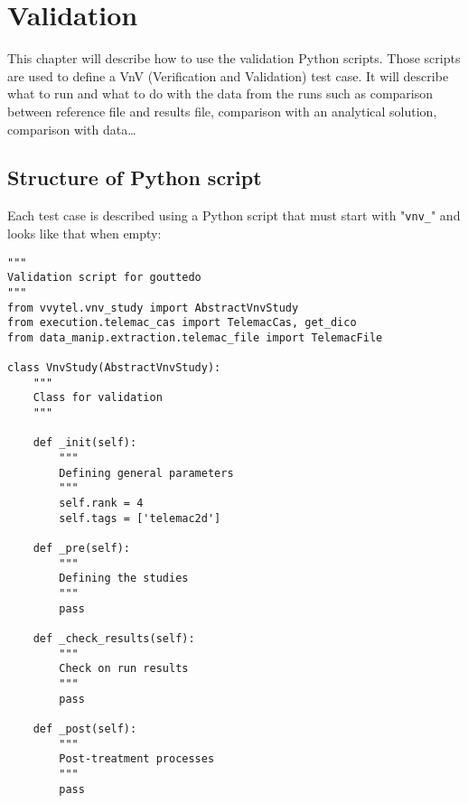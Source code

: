 \chapter{Validation}

This chapter will describe how to use the validation Python scripts.
Those scripts are used to define a VnV (Verification and Validation) test case.
It will describe what to run and what to do with the data from the runs such as
comparison between reference file and results file, comparison with an
analytical solution, comparison with data\ldots

\section{Structure of Python script}
\label{ref:descVnvStudy}

Each test case is described using a Python script that must start with
"\verb!vnv_!" and looks like that when empty:


\begin{lstlisting}
"""
Validation script for gouttedo
"""
from vvytel.vnv_study import AbstractVnvStudy
from execution.telemac_cas import TelemacCas, get_dico
from data_manip.extraction.telemac_file import TelemacFile

class VnvStudy(AbstractVnvStudy):
    """
    Class for validation
    """

    def _init(self):
        """
        Defining general parameters
        """
        self.rank = 4
        self.tags = ['telemac2d']

    def _pre(self):
        """
        Defining the studies
        """
        pass

    def _check_results(self):
        """
        Check on run results
        """
        pass

    def _post(self):
        """
        Post-treatment processes
        """
        pass
\end{lstlisting}

